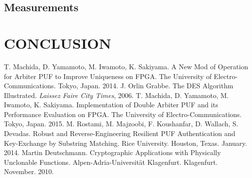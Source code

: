 \documentclass[letterpaper, 10 pt, conference]{ieeeconf}  %
\begin{document}
\subsection{Measurements} 

\section{CONCLUSION}


\addtolength{\textheight}{-12cm}   %















\begin{thebibliography}{99}

 T. Machida, D. Yamamoto, M. Iwamoto, K. Sakiyama. A New Mod of Operation for Arbiter PUF to Improve Uniqueness on FPGA. The University of Electro-Communications. Tokyo, Japan. 2014.
 J. Orlin Grabbe. The DES Algorithm Illustrated. \emph{Laissez Faire City Times}, 2006.
 T. Machida, D. Yamamoto, M. Iwamoto, K. Sakiyama. Implementation of Double Arbiter PUF and its Performance Evaluation on FPGA. The University of Electro-Communications. Tokyo, Japan. 2015.
 M. Rostami, M. Majzoobi, F. Koushanfar, D. Wallach, S. Devadas. Robust and Reverse-Engineering Resilient PUF Authentication and Key-Exchange by Substring Matching. Rice University. Houston, Texas. January. 2014.
 Martin Deutschmann. Cryptographic Applications with Physically Unclonable Functions. Alpen-Adria-Universit{\"a}t Klagenfurt. Klagenfurt. November. 2010.

\end{thebibliography}
\end{document}
